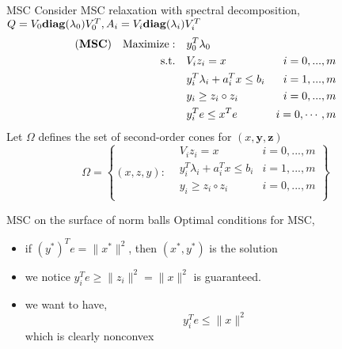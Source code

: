 

\usepackage{subfig}
\usepackage[style=authoryear]{biblatex}
\usepackage{bm}

\date{\today}




\fontsize{9pt}{11}\selectfont
\frame{\titlepage}

\begin{frame}{MSC}
  Consider MSC relaxation with spectral decomposition, \(Q =V_0 \mathbf{diag} (\lambda_0) V_0^T, A_i = V_i \mathbf{diag} (\lambda_i) V_i^T\)
  \begin{equation}\label{eq.rel.msc}
    \begin{aligned}
      (\textbf{MSC}) \quad \mathrm{Maximize: }\quad & y_0 ^T\lambda_0                                     \\
      \mathrm{s.t.} \quad                        & V_i z_i = x                        & i=0,...,m      \\
                                                 & y_i ^T\lambda_i  + a_i^Tx  \le b_i & i=1,...,m      \\
                                                 & y_i \ge z_i \circ z_i              & i=0,...,m      \\
                                                 & y_i^Te \le x^Te                    & i=0, \cdots, m
    \end{aligned}
  \end{equation}
  Let \(\Omega\) defines the set of second-order cones for \((x, \bm y, \bm z)\)
  \begin{equation}
    \Omega = \left\{ (x,z,y) :  \begin{aligned}
       & V_i z_i = x                        & i=0,...,m \\
       & y_i ^T\lambda_i  + a_i^Tx  \le b_i & i=1,...,m \\
       & y_i \ge z_i \circ z_i              & i=0,...,m \\
    \end{aligned}\right\}
  \end{equation}
\end{frame}
\begin{frame}{MSC on the surface of norm balls}
  Optimal conditions for MSC,
  \begin{itemize}
    \item if \((y^*)^Te = \|x^*\|^2\), then \((x^*, y^*)\) is the solution
    \item we notice \(y_i^Te \ge \|z_i\|^2 = \|x\|^2 \) is guaranteed.
    \item we want to have,
          \[y_i^Te \le \|x\|^2\]
          which is clearly nonconvex
  \end{itemize}
\end{frame}
